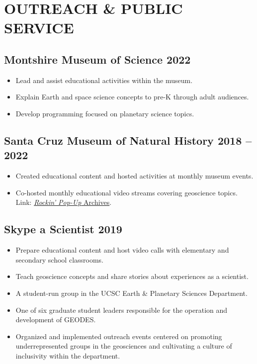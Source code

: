 \section*{OUTREACH \& PUBLIC SERVICE}

\subsection*{\textbf{Montshire Museum of Science} \hfill 2022\ongoing}
\begin{itemize}
\item Lead and assist educational activities within the museum.
\item Explain Earth and space science concepts to pre-K through adult audiences.
\item Develop programming focused on planetary science topics.
\end{itemize}

\subsection*{\textbf{Santa Cruz Museum of Natural History} \hfill 2018 – 2022}
\begin{itemize}
	\item Created educational content and hosted activities at monthly museum events.
	\item Co-hosted monthly educational video streams covering geoscience topics. \\
	Link: \href{https://www.santacruzmuseum.org/category/rockin-pop-up/}{\emph{Rockin' Pop-Up} Archives}.
\end{itemize}

\subsection*{\textbf{Skype a Scientist} \hfill 2019\ongoing}
\begin{itemize}
	\item Prepare educational content and host video calls with elementary and secondary school classrooms.
	\item Teach geoscience concepts and share stories about experiences as a scientist.
\end{itemize}

\begin{itemize}
	\item A student-run group in the UCSC Earth \& Planetary Sciences Department.
	\item One of six graduate student leaders responsible for the operation and development of GEODES.
	\item Organized and implemented outreach events centered on promoting underrepresented groups in the geosciences and cultivating a culture of inclusivity within the department.
\end{itemize}

